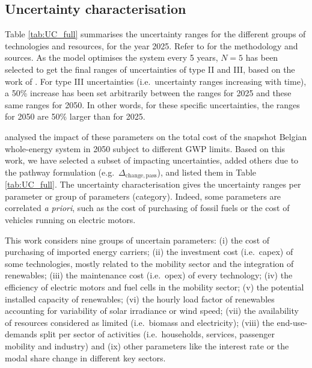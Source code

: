 \documentclass[11pt,twoside,a4paper,english]{article}
\def\eg{e.g.\ }
\def\ie{i.e.\ }
\begin{document}
\begin{appendices}
\section{Uncertainty characterisation} 
\label{app:UC_full}
Table \ref{tab:UC_full} summarises the uncertainty ranges for the different groups of technologies and resources, for the year 2025. Refer to \cite{Moret2017, Moret2017PhDThesis} for the methodology and sources. As the model optimises the system every 5 years, $N=5$ has been selected to get the final ranges of uncertainties of type II and III, based on the work of \citet{Moret2017PhDThesis}. For type III uncertainties (\ie uncertainty ranges increasing with time), a 50\% increase has been set arbitrarily between the ranges for 2025 and these same ranges for 2050. In other words, for these specific uncertainties, the ranges for 2050 are 50\% larger than for 2025.

\citet{rixhon2021role} analysed the impact of these parameters on the total cost of the snapshot Belgian whole-energy system in 2050 subject to different \gls{GWP} limits. Based on this work, we have selected a subset of impacting uncertainties, added others due to the pathway formulation (\eg $\Delta_{\mathrm{change,pass}}$), and listed them in Table \ref{tab:UC_full}. The uncertainty characterisation gives the uncertainty ranges per parameter or group of parameters (category). Indeed, some parameters are correlated \textit{a priori}, such as the cost of purchasing of fossil fuels or the cost of vehicles running on electric motors.

This work considers nine groups of uncertain parameters: (i) the cost of purchasing of imported energy carriers; (ii) the investment cost (\ie capex) of some technologies, mostly related to the mobility sector and the integration of renewables; (iii) the maintenance cost (\ie opex) of every technology; (iv) the efficiency of electric motors and fuel cells in the mobility sector; (v) the potential installed capacity of renewables; (vi) the hourly load factor of renewables accounting for variability of solar irradiance or wind speed; (vii) the availability of resources considered as limited (\ie biomass and electricity); (viii) the end-use-demands split per sector of activities (\ie households, services, passenger mobility and industry) and (ix) other parameters like the interest rate or the modal share change in different key sectors.



\end{appendices}
\end{document}
